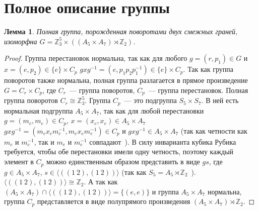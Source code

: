 \documentclass[utf8,a4paper,12pt]{article}
\newtheorem{lemma_cub}{Лемма}[section]
\begin{document}
\section{Полное описание группы}
\begin{lemma_cub}
Полная группа, порожденная поворотами двух смежных граней, изоморфна $G=\mathbb{Z}_3^5\times ((A_5\times A_7)\rtimes\mathbb{Z}_2)$.
\end{lemma_cub}
\begin{proof}
Группа перестановок нормальна, так как для любого $g=(r,p_1)\in G$ и $x=(e,p_2)\in \{e\}\times C_p$ $gxg^{-1}=(e,p_1p_2p_1^{-1})\in \{e\}\times C_p$. Так как группа поворотов также нормальна, полная группа разлагается в прямое произведение $G=C_r\times C_p$, где $C_r$~--- группа поворотов, $C_p$~--- группа перестановок. Полная группа поворотов $C_r\cong \mathbb{Z}_3^5$. Группа $C_p$~--- это подгруппа $S_5\times S_7$. В ней есть нормальная подгруппа $A_5\times A_7$, так как для любой перестановки $g=(m_c,m_e)\in C_p$, $x=(x_c,x_e)\in A_5\times A_7$ $gxg^{-1}=(m_cx_cm_c^{-1},m_ex_em_e^{-1})\in C_p$ и $gxg^{-1}\in A_5\times A_7$ (так как четности как $m_c$ и $m_c^{-1}$, так и $m_e$ и $m_e^{-1}$ совпадают~\cite{alexeev}). В силу инварианта кубика Рубика требуется, чтобы обе перестановки имели одну четность, поэтому каждый элемент в $C_p$ можно единственным образом представить в виде $gs$, где $g\in A_5\times A_7$, $s\in \langle((1~2),(1~2))\rangle$ (так как $S_5=A_5\rtimes\mathbb{Z}_2$~\cite{vinberg}). $\langle((1~2),(1~2))\rangle\cong\mathbb{Z}_2$. А так как $(A_5\times A_7)\cap \langle((1~2),(1~2))\rangle=\{(e,e)\}$ и группа $A_5\times A_7$ нормальна, группа $C_p$ представляется в виде полупрямого произведения $(A_5\times A_7)\rtimes\mathbb{Z}_2$.
\end{proof}
{}

\end{document}
